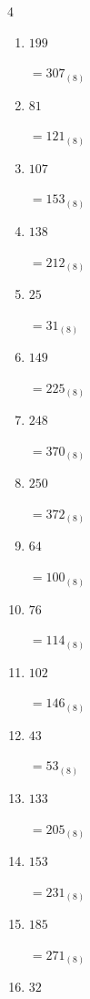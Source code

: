 \begin{multicols}{4}
\begin{enumerate}
        $=266_{(8)}$

  \item $199$

        $=307_{(8)}$

  \item $81$

        $=121_{(8)}$

  \item $107$

        $=153_{(8)}$

\columnbreak %

\resetques

  \item $138$

        $=212_{(8)}$

  \item $25$

        $=31_{(8)}$

  \item $149$

        $=225_{(8)}$

  \item $248$

        $=370_{(8)}$

  \item $250$

        $=372_{(8)}$

  \item $64$

        $=100_{(8)}$

  \item $76$

        $=114_{(8)}$

  \item $102$

        $=146_{(8)}$

  \item $43$

        $=53_{(8)}$

  \item $133$

        $=205_{(8)}$

  \item $153$

        $=231_{(8)}$

  \item $185$

        $=271_{(8)}$

  \item $32$


\end{enumerate}
\end{multicols}
